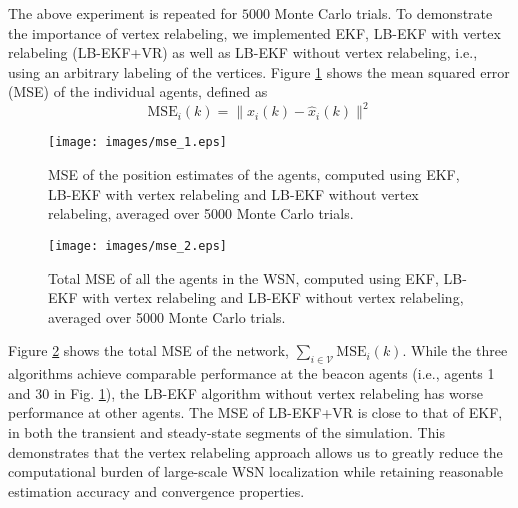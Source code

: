 \documentclass[twocolumn]{article}
\theoremstyle{plain}
\theoremstyle{definition}
\theoremstyle{definition}
\theoremstyle{remark}
\begin{document}
The above experiment is repeated for $5000$ Monte Carlo trials. To demonstrate the importance of vertex relabeling, we implemented EKF, LB-EKF with vertex relabeling (LB-EKF+VR) as well as LB-EKF without vertex relabeling, i.e., using an arbitrary labeling of the vertices. Figure \ref{fig:mse_1} shows the mean squared error (MSE) of the individual agents, defined as
\begin{equation*}
    \textrm{MSE}_i(k) = \|x_i(k) - \hat x_i(k)\|^2
\end{equation*}
\begin{figure}[h]
\centering
\texttt{[image: images/mse\_1.eps]}
\caption{MSE of the position estimates of the agents, computed using EKF, LB-EKF with vertex relabeling and LB-EKF without vertex relabeling, averaged over 5000 Monte Carlo trials.}
\label{fig:mse_1}
\end{figure}
\begin{figure}[h]
\centering
\texttt{[image: images/mse\_2.eps]}
\caption{Total MSE of all the agents in the WSN, computed using EKF, LB-EKF with vertex relabeling and LB-EKF without vertex relabeling, averaged over 5000 Monte Carlo trials.}
\label{fig:mse_2}
\end{figure}
Figure \ref{fig:mse_2} shows the total MSE of the network, $\sum _{i\in \mathcal V} \textrm{MSE}_i(k)$. While the three algorithms achieve comparable performance at the beacon agents (i.e., agents 1 and 30 in Fig. \ref{fig:mse_1}), the LB-EKF algorithm without vertex relabeling has worse performance at other agents. The MSE of LB-EKF+VR is close to that of EKF, in both the transient and steady-state segments of the simulation. This demonstrates that the vertex relabeling approach allows us to greatly reduce the computational burden of large-scale WSN localization while retaining reasonable estimation accuracy and convergence properties.
\end{document}
